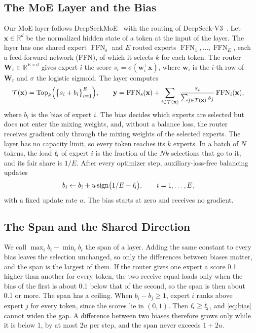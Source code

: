 \documentclass[11pt, a4paper]{article}
\newcommand{\load}[1]{\ell_{\mkern-3mu #1}} %
\newcommand{\vx}{\mathbf{x}}
\newcommand{\vw}{\mathbf{w}}
\newcommand{\Wr}{\mathbf{W}_{\mathrm{r}}}
\newcommand{\R}{\mathbb{R}}
\begin{document}
\subsection{The MoE Layer and the Bias}
\label{sec:moe}

Our MoE layer follows DeepSeekMoE~\citep{dai2024deepseekmoe} with the routing of DeepSeek-V3~\citep{deepseek2024v3}. Let $\vx \in \R^{d}$ be the normalized hidden state of a token at the input of the layer. The layer has one shared expert $\operatorname{FFN}_{\mathrm{s}}$ and $E$ routed experts $\operatorname{FFN}_1, \dots, \operatorname{FFN}_E$, each a feed-forward network (FFN), of which it selects $k$ for each token. The router $\Wr \in \R^{E \times d}$ gives expert $i$ the score $s_i = \sigma(\vw_i^{\top} \vx)$, where $\vw_i$ is the $i$-th row of $\Wr$ and $\sigma$ the logistic sigmoid. The layer computes
\begin{equation}
  \mathcal{T}(\vx) = \operatorname{Top}_k \Bigl( \bigl\{ s_i + b_i \bigr\}_{i=1}^{E} \Bigr), \qquad
  \mathbf{y} = \operatorname{FFN}_{\mathrm{s}}(\vx) + \sum_{i \in \mathcal{T}(\vx)} \frac{s_i}{\sum_{j \in \mathcal{T}(\vx)} s_j} \operatorname{FFN}_i(\vx),
  \label{eq:moe}
\end{equation}
where $b_i$ is the bias of expert $i$. The bias decides which experts are selected but does not enter the mixing weights, and, without a balance loss, the router receives gradient only through the mixing weights of the selected experts. The layer has no capacity limit, so every token reaches its $k$ experts. In a batch of $N$ tokens, the load $\load{i}$ of expert $i$ is the fraction of the $Nk$ selections that go to it, and its fair share is $1/E$. After every optimizer step, auxiliary-loss-free balancing~\citep{wang2024lossfree} updates
\begin{equation}
  b_i \leftarrow b_i + u \operatorname{sign}\bigl( 1/E - \load{i} \bigr), \qquad i = 1, \dots, E,
  \label{eq:bias}
\end{equation}
with a fixed update rate $u$. The bias starts at zero and receives no gradient.

\subsection{The Span and the Shared Direction}
\label{sec:span}

We call $\max_i b_i - \min_i b_i$ the span of a layer. Adding the same constant to every bias leaves the selection unchanged, so only the differences between biases matter, and the span is the largest of them. If the router gives one expert a score 0.1 higher than another for every token, the two receive equal loads only when the bias of the first is about 0.1 below that of the second, so the span is then about 0.1 or more. The span has a ceiling. When $b_i - b_j \geq 1$, expert $i$ ranks above expert $j$ for every token, since the scores lie in $(0, 1)$. Then $\load{i} \geq \load{j}$, and \cref{eq:bias} cannot widen the gap. A difference between two biases therefore grows only while it is below 1, by at most $2u$ per step, and the span never exceeds $1 + 2u$.
\end{document}
